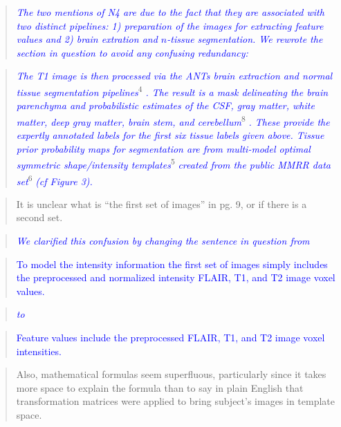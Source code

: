 \documentclass[12pt,]{article}
\begin{document}
\begin{quote}
\emph{\textcolor{blue}{The two mentions of N4 are due to the fact that they are associated
with two distinct pipelines:  1) preparation of the images for extracting feature values
and 2) brain extration and $n$-tissue segmentation.  We rewrote the section in question
to avoid any confusing redundancy:}}
\end{quote}

\begin{quote}
\emph{\textcolor{blue}{The T1 image is then processed via the ANTs brain
extraction and normal tissue segmentation pipelines}}\textsuperscript{4}
\emph{\textcolor{blue}{.  The result is a mask delineating the brain
parenchyma and probabilistic estimates of the CSF, gray matter, white matter,
deep gray matter, brain stem, and cerebellum}}\textsuperscript{8}
\emph{\textcolor{blue}{.  These provide the expertly annotated labels for the
first six tissue labels given above.  Tissue prior probability maps for segmentation
are from multi-model optimal symmetric shape/intensity templates}}\textsuperscript{5}
\emph{\textcolor{blue}{created from the public MMRR data set}}\textsuperscript{6}
\emph{\textcolor{blue}{(cf Figure 3).}}
\end{quote}

\begin{quote}
It is unclear what is ``the first set of images'' in pg. 9, or if there
is a second set.
\end{quote}

\begin{quote}
\emph{\textcolor{blue}{We clarified this confusion by changing the sentence in question from}}
\end{quote}

\begin{quote}
\textcolor{blue}{To model the intensity information the first set of images simply includes the
preprocessed and normalized intensity FLAIR, T1, and T2 image voxel values.}
\end{quote}

\begin{quote}
\emph{\textcolor{blue}{to}}
\end{quote}

\begin{quote}
\textcolor{blue}{Feature values include the preprocessed FLAIR, T1, and T2 image voxel intensities.}
\end{quote}

\begin{quote}
Also, mathematical formulas seem superfluous, particularly since it
takes more space to explain the formula than to say in plain English
that transformation matrices were applied to bring subject's images in
template space.
\end{quote}
\end{document}
